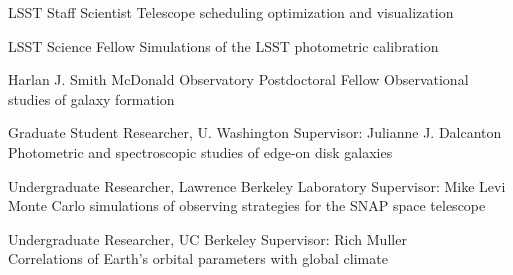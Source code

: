 

{\sc LSST Staff Scientist}
Telescope scheduling optimization and visualization

{\sc LSST Science Fellow}
Simulations of the LSST photometric calibration 

{\sc Harlan J. Smith McDonald Observatory Postdoctoral Fellow}
Observational studies of galaxy formation

{\sc Graduate Student Researcher, U. Washington}
Supervisor: Julianne J. Dalcanton \\
Photometric and spectroscopic studies of edge-on disk galaxies

{\sc Undergraduate Researcher, Lawrence Berkeley Laboratory}
Supervisor: Mike Levi \\
Monte Carlo simulations of observing strategies for the SNAP space telescope

{\sc Undergraduate Researcher, UC Berkeley}
Supervisor: Rich Muller\\
Correlations of Earth's orbital parameters with global climate
